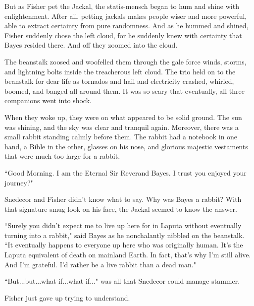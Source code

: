 \documentclass{article}
\begin{document}
But as Fisher pet the Jackal, the statis-mensch began to hum and shine with enlightenment. After all, petting jackals makes people wiser and more powerful, able to extract certainty from pure randomness. And as he hummed and shined, Fisher suddenly chose the left cloud, for he suddenly knew with certainty that Bayes resided there. And off they zoomed into the cloud. \newline

The beanstalk zoosed and woofelled them through the gale force winds, storms, and lightning bolts inside the treacherous left cloud. The trio held on to the beanstalk for dear life as tornados and hail and electricity crashed, whirled, boomed, and banged all around them. It was so scary that eventually, all three companions went into shock. \newline \newline



When they woke up, they were on what appeared to be solid ground. The sun was shining, and the sky was clear and tranquil again. Moreover, there was a small rabbit standing calmly before them. The rabbit had a notebook in one hand, a Bible in the other, glasses on his nose, and glorious majestic vestaments that were much too large for a rabbit. \newline

``Good Morning. I am the Eternal Sir Reverand Bayes. I trust you enjoyed your journey?" \newline

Snedecor and Fisher didn't know what to say. Why was Bayes a rabbit? With that signature smug look on his face, the Jackal seemed to know the answer. \newline

``Surely you didn't expect me to live up here for in Laputa without eventually turning into a rabbit," said Bayes as he nonchalantly nibbled on the beanstalk. ``It eventually happens to everyone up here who was originally human. It's the Laputa equivalent of death on mainland Earth. In fact, that's why I'm still alive. And I'm grateful. I'd rather be a live rabbit than a dead man." \newline

``But...but...what if...what if..." was all that Snedecor could manage stammer. \newline

Fisher just gave up trying to understand. \newline
\end{document}
